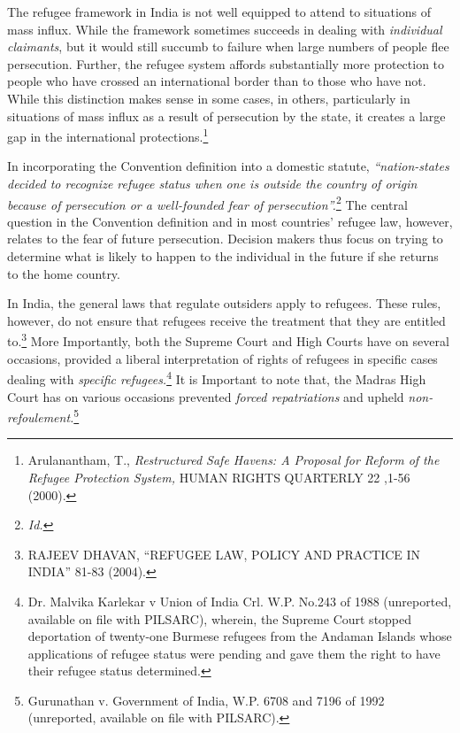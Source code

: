 \begin{multicols}{2}

\noi
The refugee framework in India is not well equipped to attend to situations of mass influx.
While the framework sometimes succeeds in dealing with \textit{individual claimants}, but it would
still succumb to failure when large numbers of people flee persecution. Further, the refugee
system affords substantially more protection to people who have crossed an international
border than to those who have not. While this distinction makes sense in some cases, in
others, particularly in situations of mass influx as a result of persecution by the state, it creates
a large gap in the international protections.\footnote{Arulanantham, T., \textit{ Restructured Safe Havens: A Proposal for Reform of the Refugee Protection System,} HUMAN RIGHTS QUARTERLY 22 ,1-56 (2000).}

\noi
In incorporating the Convention definition into a domestic statute, \textit{“nation-states decided to
recognize refugee status when one is outside the country of origin because of persecution or a
well-founded fear of persecution”.}\footnote{\textit{Id.}} The central question in the Convention definition and in
most countries' refugee law, however, relates to the fear of future persecution. Decision
makers thus focus on trying to determine what is likely to happen to the individual in the
future if she returns to the home country.

\noi
In India, the general laws that regulate outsiders apply to refugees. These rules, however, do
not ensure that refugees receive the treatment that they are entitled to.\footnote{RAJEEV DHAVAN, “REFUGEE LAW, POLICY AND PRACTICE IN INDIA” 81-83 (2004).} More Importantly,
both the Supreme Court and High Courts have on several occasions, provided a liberal
interpretation of rights of refugees in specific cases dealing with \textit{specific refugees.}\footnote{Dr. Malvika Karlekar v Union of India Crl. W.P. No.243 of 1988 (unreported, available on file with PILSARC), wherein, the Supreme Court stopped deportation of twenty-one Burmese refugees from the Andaman Islands whose applications of refugee status were pending and gave them the right to
have their refugee status determined.} It is Important to note that, the Madras High Court has on various occasions prevented \textit{forced repatriations} and upheld \textit{non-refoulement.}\footnote{Gurunathan v. Government of India, W.P. 6708 and 7196 of 1992 (unreported, available on file with PILSARC).}


\end{multicols}
